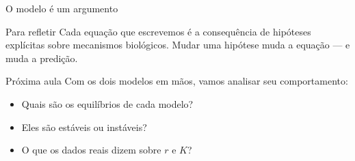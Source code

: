 \documentclass[12pt]{beamer}
\begin{document}
\begin{frame}{O modelo é um argumento}

  \begin{block}{Para refletir}
    Cada equação que escrevemos é a consequência de
    hipóteses explícitas sobre mecanismos biológicos.
    Mudar uma hipótese muda a equação --- e muda a predição.
  \end{block}

  \bigskip
  \begin{exampleblock}{Próxima aula}
    Com os dois modelos em mãos, vamos analisar seu comportamento:
    \begin{itemize}
      \item Quais são os equilíbrios de cada modelo?
      \item Eles são estáveis ou instáveis?
      \item O que os dados reais dizem sobre $r$ e $K$?
    \end{itemize}
  \end{exampleblock}

\end{frame}
\end{document}
